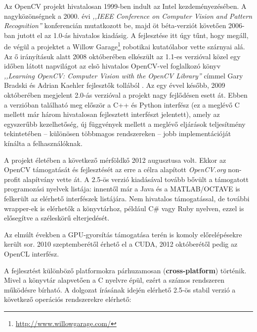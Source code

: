 \bigskip

Az OpenCV projekt hivatalosan 1999-ben indult az Intel kezdeményezésében. A nagyközönségnek a 2000. évi \textit{,,IEEE Conference on Computer Vision and Pattern Recognition''} konferencián mutatkozott be, majd öt béta-verziót követően 2006-ban jutott el az 1.0-ás hivatalos kiadásig. A fejlesztése itt úgy tűnt, hogy megáll, de végül a projektet a Willow Garage\footnote{\url{http://www.willowgarage.com/}} robotikai kutatólabor vette szárnyai alá. Az ő irányításuk alatt 2008 októberében elkészült az 1.1-es verzióval közel egy időben látott napvilágot az elsõ hivatalos OpenCV-vel foglalkozó könyv \textit{,,Learning OpenCV: Computer Vision with the OpenCV Library''} címmel Gary Bradski és Adrian Kaehler fejlesztők tollából \cite{opencv_book}. Az egy évvel később, 2009 októberében megjelent 2.0-ás verzióval a projekt nagy fejlődésen esett át. Ebben a verzióban található meg először a C++ és Python interfész (ez a meglévő C mellett már három hivatalosan fejlesztett interfészt jelentett), amely az egyszerűbb kezelhetőség, új függvények mellett a meglévő eljárások teljesítmény tekintetében -- különösen többmagos rendszereken -- jobb implementációját kínálta a felhasználóknak.

\bigskip

A projekt életében a következő mérföldkő 2012 augusztusa volt. Ekkor az OpenCV támogatását és fejlesztését az erre a célra alapított \emph{OpenCV.org} non-profit alapítvány vette át. A 2.5-ös verzió kiadásával tovább bővült a támogatott programozási nyelvek listája: innentől már a Java és a MATLAB/OCTAVE is felkerült az elérhető interfészek listájára. Nem hivatalos támogatással, de további wrapper-ek is elérhetők a könyvtárhoz, például C\# vagy Ruby nyelven, ezzel is elősegítve a széleskörű elterjedését. 

Az elmúlt években a GPU-gyorsítás támogatása terén is komoly előrelépésekre került sor. 2010 szeptemberétől érhető el a CUDA, 2012 októberétől pedig az OpenCL interfész.

\bigskip

A fejlesztést különböző platformokra párhuzamosan (\textbf{cross-platform}) történik. Mivel a könyvtár alapvetően a C nyelvre épül, ezért a számos rendszeren működésre bírható. A dolgozat írásának idején elérhető 2.5-ös stabil verzió a következő operációs rendszerekre elérhető:

